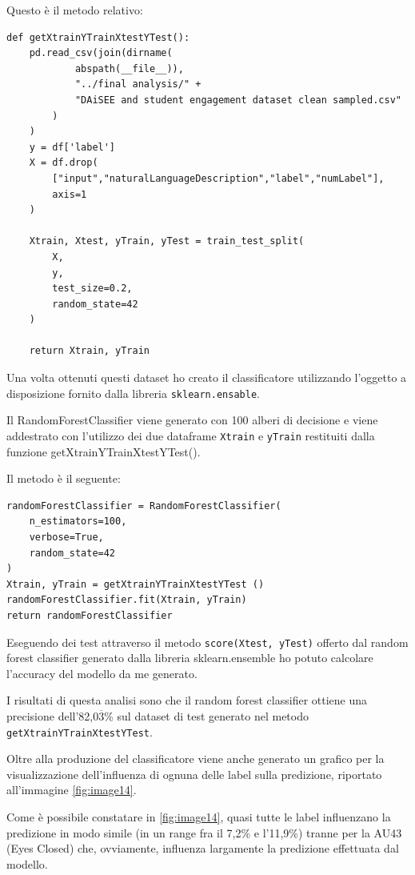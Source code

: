 Questo è il metodo relativo:
\begin{verbatim}
def getXtrainYTrainXtestYTest():
    pd.read_csv(join(dirname(
            abspath(__file__)), 
            "../final analysis/" + 
            "DAiSEE and student engagement dataset clean sampled.csv"
        )
    )
    y = df['label']
    X = df.drop(
        ["input","naturalLanguageDescription","label","numLabel"], 
        axis=1
    )
    
    Xtrain, Xtest, yTrain, yTest = train_test_split(
        X, 
        y, 
        test_size=0.2, 
        random_state=42
    )

    return Xtrain, yTrain 
\end{verbatim}
Una volta ottenuti questi dataset ho creato il classificatore utilizzando l’oggetto a disposizione fornito dalla libreria \texttt{sklearn.ensable}.

Il RandomForestClassifier viene generato con 100 alberi di decisione e viene addestrato con l’utilizzo dei due dataframe \texttt{Xtrain} e \texttt{yTrain} restituiti dalla funzione getXtrainYTrainXtestYTest().

Il metodo è il seguente:
\begin{verbatim}
randomForestClassifier = RandomForestClassifier(
    n_estimators=100, 
    verbose=True, 
    random_state=42
)
Xtrain, yTrain = getXtrainYTrainXtestYTest ()
randomForestClassifier.fit(Xtrain, yTrain)
return randomForestClassifier
\end{verbatim}

Eseguendo dei test attraverso il metodo \texttt{score(Xtest, yTest)} offerto dal random forest classifier generato dalla libreria sklearn.ensemble ho potuto calcolare l’accuracy del modello da me generato.

I risultati di questa analisi sono che il random forest classifier ottiene una precisione dell’82,$0\overline{3}$\% sul dataset di test generato nel metodo \texttt{getXtrainYTrainXtestYTest}.

Oltre alla produzione del classificatore viene anche generato un grafico per la visualizzazione dell’influenza di ognuna delle label sulla predizione, riportato all'immagine \ref{fig:image14}.

Come è possibile constatare in \ref{fig:image14}, quasi tutte le label influenzano la predizione in modo simile (in un range fra il 7,2\% e l’11,9\%) tranne per la AU43 (Eyes Closed) che, ovviamente, influenza largamente la predizione effettuata dal modello.

